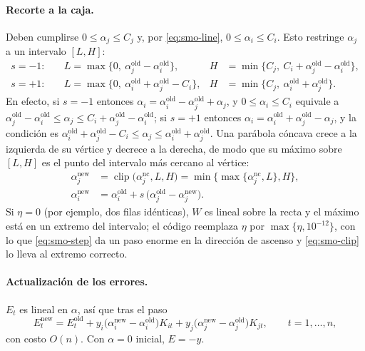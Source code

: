 \documentclass[11pt,a4paper]{article}
\DeclareMathOperator{\clip}{clip}
\theoremstyle{plain}
\theoremstyle{definition}
\theoremstyle{remark}
\numberwithin{equation}{section}
\begin{document}
\paragraph{Recorte a la caja.} Deben cumplirse $0\le\alpha_j\le C_j$ y, por
\eqref{eq:smo-line}, $0\le\alpha_i\le C_i$. Esto restringe $\alpha_j$ a un intervalo
$[L,H]$:
\begin{align}
  s=-1:\quad & L=\max\{0,\ \alpha_j^{\mathrm{old}}-\alpha_i^{\mathrm{old}}\}, &
               H&=\min\{C_j,\ C_i+\alpha_j^{\mathrm{old}}-\alpha_i^{\mathrm{old}}\},
               \label{eq:smo-box-opposite}\\
  s=+1:\quad & L=\max\{0,\ \alpha_i^{\mathrm{old}}+\alpha_j^{\mathrm{old}}-C_i\}, &
               H&=\min\{C_j,\ \alpha_i^{\mathrm{old}}+\alpha_j^{\mathrm{old}}\}.
               \label{eq:smo-box-same}
\end{align}
En efecto, si $s=-1$ entonces
$\alpha_i=\alpha_i^{\mathrm{old}}-\alpha_j^{\mathrm{old}}+\alpha_j$, y
$0\le\alpha_i\le C_i$ equivale a
$\alpha_j^{\mathrm{old}}-\alpha_i^{\mathrm{old}}\le\alpha_j\le
C_i+\alpha_j^{\mathrm{old}}-\alpha_i^{\mathrm{old}}$; si $s=+1$ entonces
$\alpha_i=\alpha_i^{\mathrm{old}}+\alpha_j^{\mathrm{old}}-\alpha_j$, y la condición es
$\alpha_i^{\mathrm{old}}+\alpha_j^{\mathrm{old}}-C_i\le\alpha_j\le
\alpha_i^{\mathrm{old}}+\alpha_j^{\mathrm{old}}$. Una parábola cóncava crece a la izquierda de
su vértice y decrece a la derecha, de modo que su máximo sobre $[L,H]$ es el punto del
intervalo más cercano al vértice:
\begin{align}
  \alpha_j^{\mathrm{new}}&=\clip\bigl(\alpha_j^{\mathrm{nc}},L,H\bigr)
    =\min\bigl\{\max\{\alpha_j^{\mathrm{nc}},L\},H\bigr\}, \label{eq:smo-clip}\\
  \alpha_i^{\mathrm{new}}&=\alpha_i^{\mathrm{old}}
    +s\,\bigl(\alpha_j^{\mathrm{old}}-\alpha_j^{\mathrm{new}}\bigr). \label{eq:smo-alpha-i}
\end{align}
Si $\eta=0$ (por ejemplo, dos filas idénticas), $W$ es lineal sobre la recta y el máximo está
en un extremo del intervalo; el código reemplaza $\eta$ por $\max\{\eta,10^{-12}\}$, con lo
que \eqref{eq:smo-step} da un paso enorme en la dirección de ascenso y \eqref{eq:smo-clip} lo
lleva al extremo correcto.

\paragraph{Actualización de los errores.} $E_t$ es lineal en $\alpha$, así que tras el paso
\begin{equation}\label{eq:smo-error-update}
  E_t^{\mathrm{new}}=E_t^{\mathrm{old}}
  +y_i\bigl(\alpha_i^{\mathrm{new}}-\alpha_i^{\mathrm{old}}\bigr)K_{it}
  +y_j\bigl(\alpha_j^{\mathrm{new}}-\alpha_j^{\mathrm{old}}\bigr)K_{jt},
  \qquad t=1,\dots,n,
\end{equation}
con costo $O(n)$. Con $\alpha=0$ inicial, $E=-y$.
\end{document}
